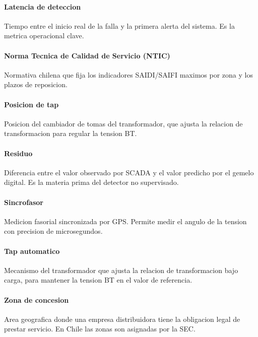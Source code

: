 \paragraph{Latencia de deteccion}
Tiempo entre el inicio real de la falla y la primera alerta del
sistema. Es la metrica operacional clave.

\paragraph{Norma Tecnica de Calidad de Servicio (NTIC)}
Normativa chilena que fija los indicadores SAIDI/SAIFI maximos
por zona y los plazos de reposicion.

\paragraph{Posicion de tap}
Posicion del cambiador de tomas del transformador, que ajusta la
relacion de transformacion para regular la tension BT.

\paragraph{Residuo}
Diferencia entre el valor observado por SCADA y el valor
predicho por el gemelo digital. Es la materia prima del detector
no supervisado.

\paragraph{Sincrofasor}
Medicion fasorial sincronizada por GPS. Permite medir el angulo
de la tension con precision de microsegundos.

\paragraph{Tap automatico}
Mecanismo del transformador que ajusta la relacion de
transformacion bajo carga, para mantener la tension BT en el
valor de referencia.

\paragraph{Zona de concesion}
Area geografica donde una empresa distribuidora tiene la
obligacion legal de prestar servicio. En Chile las zonas son
asignadas por la SEC.